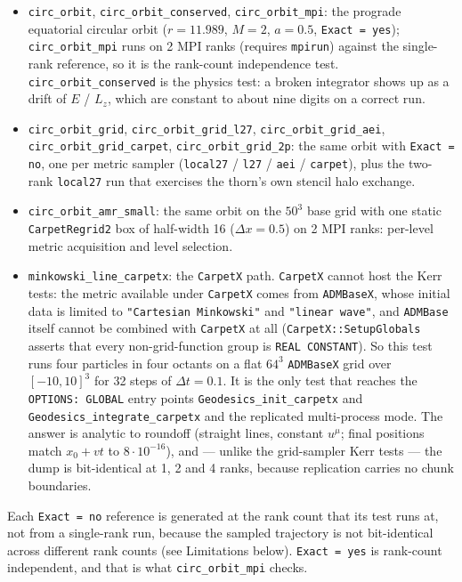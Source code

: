 \documentclass{article}
\begin{document}
\begin{itemize}
\item \texttt{circ\_orbit}, \texttt{circ\_orbit\_conserved},
  \texttt{circ\_orbit\_mpi}: the prograde equatorial circular orbit
  ($r = 11.989$, $M = 2$, $a = 0.5$, \texttt{Exact = yes});
  \texttt{circ\_orbit\_mpi} runs on 2 MPI ranks (requires
  \texttt{mpirun}) against the single-rank reference, so it is the
  rank-count independence test.
  \texttt{circ\_orbit\_conserved} is the physics test: a broken
  integrator shows up as a drift of $E$ / $L_z$, which are constant to
  about nine digits on a correct run.
\item \texttt{circ\_orbit\_grid}, \texttt{circ\_orbit\_grid\_l27},
  \texttt{circ\_orbit\_grid\_aei}, \texttt{circ\_orbit\_grid\_carpet},
  \texttt{circ\_orbit\_grid\_2p}: the same orbit with
  \texttt{Exact = no}, one per metric sampler
  (\texttt{local27} / \texttt{l27} / \texttt{aei} / \texttt{carpet}),
  plus the two-rank \texttt{local27} run that exercises the thorn's own
  stencil halo exchange.
\item \texttt{circ\_orbit\_amr\_small}: the same orbit on the $50^3$
  base grid with one static \texttt{CarpetRegrid2} box of half-width 16
  ($\Delta x = 0.5$) on 2 MPI ranks: per-level metric acquisition and
  level selection.
\item \texttt{minkowski\_line\_carpetx}: the \texttt{CarpetX} path.
  \texttt{CarpetX} cannot host the Kerr tests: the metric available under
  \texttt{CarpetX} comes from \texttt{ADMBaseX}, whose
  initial data is limited to \texttt{"Cartesian Minkowski"} and
  \texttt{"linear wave"}, and \texttt{ADMBase} itself cannot be combined
  with \texttt{CarpetX} at all (\texttt{CarpetX::SetupGlobals} asserts
  that every non-grid-function group is \texttt{REAL CONSTANT}).  So this
  test runs four particles in four octants on a flat $64^3$
  \texttt{ADMBaseX} grid over $[-10,10]^3$ for 32 steps of
  $\Delta t = 0.1$.  It is the only test that reaches the
  \texttt{OPTIONS: GLOBAL} entry points \texttt{Geodesics\_init\_carpetx}
  and \texttt{Geodesics\_integrate\_carpetx} and the replicated
  multi-process mode.  The answer is analytic to roundoff (straight
  lines, constant $u^\mu$; final positions match $x_0 + v t$ to
  $8\cdot10^{-16}$), and --- unlike the grid-sampler Kerr tests --- the
  dump is bit-identical at 1, 2 and 4 ranks, because replication carries
  no chunk boundaries.
\end{itemize}

Each \texttt{Exact = no} reference is generated at the rank count that
its test runs at, not from a single-rank run, because the sampled
trajectory is not bit-identical across different rank counts (see
Limitations below).  \texttt{Exact = yes} is rank-count independent, and
that is what \texttt{circ\_orbit\_mpi} checks.
\end{document}
